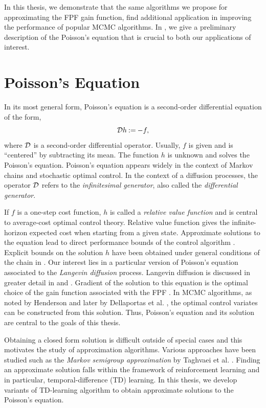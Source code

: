 In this thesis, we demonstrate that the same algorithms we propose for approximating the FPF gain function, find additional application in improving the performance of popular MCMC algorithms. In , we give a preliminary description of the Poisson's equation that is crucial to both our applications of interest.

\section{Poisson's Equation} 
\label{poissons_eq}
In its most general form, Poisson's equation is a second-order differential equation of the form,
\begin{equation*}
{\cal D} h \mathbin{:=} - f,
\end{equation*}
where ${\cal D}$ is a second-order differential operator. Usually, $f$ is given and is ``centered'' by subtracting its mean. The function $h$ is unknown and solves the Poisson's equation. Poisson's equation appears widely in the context of Markov chains and stochastic optimal control. In the context of a diffusion processes, the operator ${\cal D}$ refers to the \textit{infinitesimal generator}, also called the \textit{differential generator}. 

If $f$ is a one-step cost function, $h$ is called a \textit{relative value function} and is central to average-cost optimal control theory.  Relative value function gives the infinite-horizon expected cost when starting from a given state. Approximate solutions to the equation lead to direct performance bounds of the control algorithm \cite{ctcn}. Explicit bounds on the solution $h$ have been obtained under general conditions of the chain in \cite{}.
Our interest lies in a particular version of Poisson's equation associated to the \textit{Langevin diffusion} process. Langevin diffusion is discussed in greater detail in  and . Gradient of the solution to this equation is the optimal choice of the gain function associated with the FPF \cite{yanmehmey13}. In MCMC algorithms, as noted by Henderson \cite{henthesis97} and later by Dellaportas et al. \cite{delkon12}, the optimal control variates can be constructed from this solution. Thus, Poisson's equation and its solution are central to the goals of this thesis. 

Obtaining a closed form solution is difficult outside of special cases and this motivates the study of approximation algorithms. Various approaches have been studied such as the \textit{Markov semigroup approximation} by Taghvaei et al. \cite{tagmeh16a}. Finding an approximate solution falls within the framework of reinforcement learning and in particular, temporal-difference (TD) learning. In this thesis, we develop variants of TD-learning algorithm to obtain approximate solutions to the Poisson's equation.

